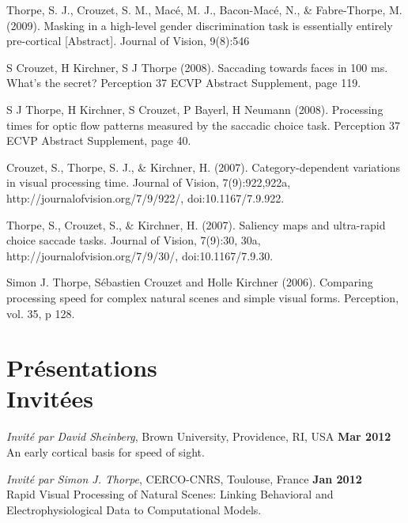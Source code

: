 \documentclass[margin,line]{resume}
\begin{document}
\begin{resume}
	\vspace{-2mm} Thorpe, S. J., Crouzet, S. M., Macé, M. J., Bacon-Macé, N., \& Fabre-Thorpe, M. (2009). Masking in a high-level gender discrimination task is essentially entirely pre-cortical [Abstract]. Journal of Vision, 9(8):546

	\vspace{-2mm} S Crouzet, H Kirchner, S J Thorpe (2008). Saccading towards faces in 100 ms. What's the secret? Perception 37 ECVP Abstract Supplement, page 119. 
	
	\vspace{-2mm} S J Thorpe, H Kirchner, S Crouzet, P Bayerl, H Neumann (2008). Processing times for optic flow patterns measured by the saccadic choice task. Perception 37 ECVP Abstract Supplement, page 40.

	\vspace{-2mm} Crouzet, S., Thorpe, S. J., \& Kirchner, H. (2007). Category-dependent variations in visual processing time. Journal of Vision, 7(9):922,922a, http://journalofvision.org/7/9/922/, doi:10.1167/7.9.922.

	\vspace{-2mm} Thorpe, S., Crouzet, S., \& Kirchner, H. (2007). Saliency maps and ultra-rapid choice saccade tasks. Journal of Vision, 7(9):30, 30a, http://journalofvision.org/7/9/30/, doi:10.1167/7.9.30.

	\vspace{-2mm} Simon J. Thorpe, Sébastien Crouzet and Holle Kirchner (2006). Comparing processing speed for complex natural scenes and simple visual forms. Perception, vol. 35, p 128.

	\normalsize

\vspace{3mm}
\section{\mysidestyle Présentations\\Invitées}
    
	\footnotesize

	\textit{Invité par David Sheinberg}, Brown University, Providence, RI, USA \hfill \textbf{Mar 2012}\\
	An early cortical basis for speed of sight. 

	\vspace{-2mm} 
	\textit{Invité par Simon J. Thorpe}, CERCO-CNRS, Toulouse, France \hfill \textbf{Jan 2012}\\
	Rapid Visual Processing of Natural Scenes: Linking Behavioral and Electrophysiological Data to Computational Models.


\end{resume}
\end{document}
